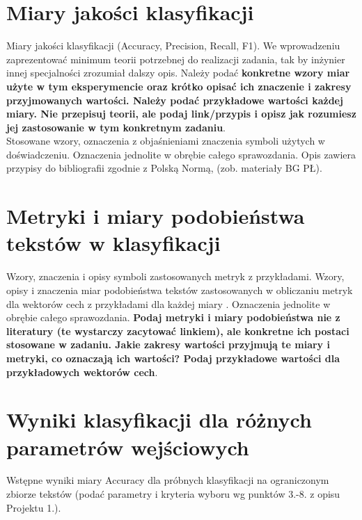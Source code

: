 \documentclass{article}
\begin{document}
\section{Miary jakości klasyfikacji} 
Miary jakości klasyfikacji (Accuracy, Precision,
Recall, F1). We wprowadzeniu zaprezentować minimum teorii potrzebnej do realizacji
zadania, tak by inżynier innej specjalności zrozumiał dalszy opis. Należy podać {\bf konkretne wzory miar użyte w tym eksperymencie oraz krótko
opisać ich znaczenie i zakresy przyjmowanych wartości. Należy podać przykładowe
wartości każdej miary. Nie przepisuj
teorii, ale podaj link/przypis i opisz jak rozumiesz jej zastosowanie w tym konkretnym
zadaniu}. \\
\indent Stosowane wzory, oznaczenia z objaśnieniami znaczenia symboli użytych w
doświadczeniu. Oznaczenia jednolite w obrębie całego sprawozdania.  Opis zawiera przypisy do bibliografii zgodnie z
Polską Normą, (zob. materiały BG PŁ).\\


\section{Metryki i miary podobieństwa tekstów w klasyfikacji}
Wzory, znaczenia i opisy symboli zastosowanych metryk z
przykładami. Wzory, opisy i znaczenia miar
podobieństwa tekstów zastosowanych w obliczaniu metryk dla wektorów cech z
przykładami dla każdej miary \cite{niewiadomski08}.  Oznaczenia jednolite w obrębie całego sprawozdania.  {\bf Podaj metryki i miary
podobieństwa nie z literatury (te wystarczy zacytować linkiem), ale konkretne ich
postaci stosowane w zadaniu. Jakie zakresy wartości przyjmują te miary i
metryki, co oznaczają ich wartości? Podaj przykładowe wartości dla przykładowych wektorów cech}. \\ 

\section{Wyniki klasyfikacji dla różnych parametrów wejściowych}
Wstępne wyniki miary Accuracy dla próbnych klasyfikacji na ograniczonym zbiorze tekstów (podać parametry i kryteria
wyboru wg punktów 3.-8. z opisu Projektu 1.). 
\end{document}
